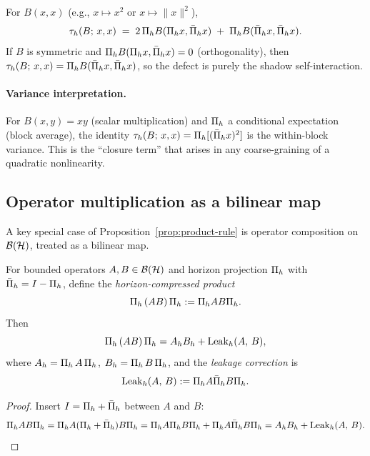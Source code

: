 \begin{corollary}
\label{cor:quadratic-defect}
For $B(x,x)$ (e.g., $x \mapsto x^2$ or $x \mapsto \|x\|^2$),
\[
\tau_{h}(B;\, x, x)
\;=\;
2\,\Pi_{h} B(\Pi_{h} x, \bar{\Pi}_{h} x)
\;+\;
\Pi_{h} B(\bar{\Pi}_{h} x, \bar{\Pi}_{h} x).
\]
If $B$ is symmetric and
$\Pi_{h} B(\Pi_{h} x, \bar{\Pi}_{h} x) = 0$ (orthogonality), then
$\tau_{h}(B;\, x, x) = \Pi_{h} B(\bar{\Pi}_{h} x, \bar{\Pi}_{h} x)$, so the
defect is purely the shadow self-interaction.
\end{corollary}

\paragraph{Variance interpretation.}
For $B(x,y) = xy$ (scalar multiplication) and $\Pi_{h}$ a conditional expectation (block average), the identity $\tau_{h}(B;\, x, x) = \Pi_{h}[(\bar{\Pi}_{h} x)^2]$ is the within-block variance.
This is the ``closure term'' that arises in any coarse-graining of a quadratic nonlinearity.

\subsection{Operator multiplication as a bilinear map}

A key special case of Proposition~\ref{prop:product-rule} is operator composition on $\mathcal{B}(\mathcal{H})$, treated as a bilinear map.

\begin{lemma}
\label{lem:operator-product-closure}
For bounded operators $A, B \in \mathcal{B}(\mathcal{H})$ and horizon projection $\Pi_{h}$ with $\bar{\Pi}_{h} = I - \Pi_{h}$, define the \emph{horizon-compressed product}
\[
\Pi_{h}\, (AB) \,\Pi_{h} := \Pi_{h} A B \Pi_{h}.
\]
Then
\[
\Pi_{h}\, (AB) \,\Pi_{h} = A_{h} B_{h} + \mathrm{Leak}_{h}(A,\, B),
\]
where $A_{h} = \Pi_{h}\, A \,\Pi_{h}$, $B_{h} = \Pi_{h}\, B \,\Pi_{h}$, and the \emph{leakage correction} is
\[
\mathrm{Leak}_{h}(A,\, B) := \Pi_{h} A \bar{\Pi}_{h} B \Pi_{h}.
\]
\end{lemma}

\begin{proof}
Insert $I = \Pi_{h} + \bar{\Pi}_{h}$ between $A$ and $B$:
\[
\Pi_{h} A B \Pi_{h} = \Pi_{h} A (\Pi_{h} + \bar{\Pi}_{h}) B \Pi_{h} = \Pi_{h} A \Pi_{h} B \Pi_{h} + \Pi_{h} A \bar{\Pi}_{h} B \Pi_{h} = A_{h} B_{h} + \mathrm{Leak}_{h}(A,\, B). \qedhere
\]
\end{proof}


